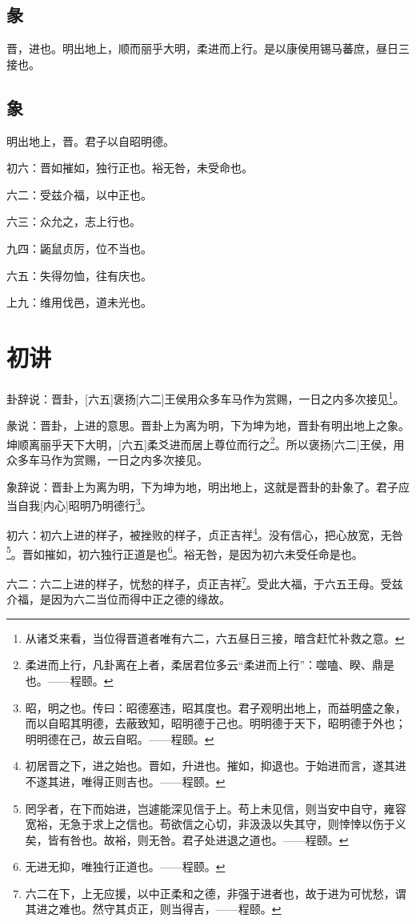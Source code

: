 \documentclass[12pt,oneside]{book}
\begin{document}
\subsection{彖}
晋，进也。明出地上，顺而丽乎大明，柔进而上行。是以康侯用锡马蕃庶，昼日三接也。

\subsection{象}
明出地上，晋。君子以自昭明德。

初六：晋如摧如，独行正也。裕无咎，未受命也。

六二：受兹介福，以中正也。

六三：众允之，志上行也。

九四：鼫鼠贞厉，位不当也。

六五：失得勿恤，往有庆也。

上九：维用伐邑，道未光也。

\section{初讲}
卦辞说：晋卦，[六五]褒扬[六二]王侯用众多车马作为赏赐，一日之内多次接见\footnote{从诸爻来看，当位得晋道者唯有六二，六五昼日三接，暗含赶忙补救之意。}。

彖说：晋卦，上进的意思。晋卦上为离为明，下为坤为地，晋卦有明出地上之象。坤顺离丽乎天下大明，[六五]柔爻进而居上尊位而行之\footnote{柔进而上行，凡卦离在上者，柔居君位多云“柔进而上行”：噬嗑、睽、鼎是也。——程颐。}。所以褒扬[六二]王侯，用众多车马作为赏赐，一日之内多次接见。

象辞说：晋卦上为离为明，下为坤为地，明出地上，这就是晋卦的卦象了。君子应当自我[内心]昭明乃明德行\footnote{昭，明之也。传曰：昭德塞违，昭其度也。君子观明出地上，而益明盛之象，而以自昭其明德，去蔽致知，昭明德于己也。明明德于天下，昭明德于外也；明明德在己，故云自昭。——程颐。}。

初六：初六上进的样子，被挫败的样子，贞正吉祥\footnote{初居晋之下，进之始也。晋如，升进也。摧如，抑退也。于始进而言，遂其进不遂其进，唯得正则吉也。——程颐。}。没有信心，把心放宽，无咎\footnote{罔孚者，在下而始进，岂遽能深见信于上。苟上未见信，则当安中自守，雍容宽裕，无急于求上之信也。苟欲信之心切，非汲汲以失其守，则悻悻以伤于义矣，皆有咎也。故裕，则无咎。君子处进退之道也。——程颐。}。晋如摧如，初六独行正道是也\footnote{无进无抑，唯独行正道也。——程颐。}。裕无咎，是因为初六未受任命是也。

六二：六二上进的样子，忧愁的样子，贞正吉祥\footnote{六二在下，上无应援，以中正柔和之德，非强于进者也，故于进为可忧愁，谓其进之难也。然守其贞正，则当得吉，——程颐。}。受此大福，于六五王母。受兹介福，是因为六二当位而得中正之德的缘故。
\end{document}
